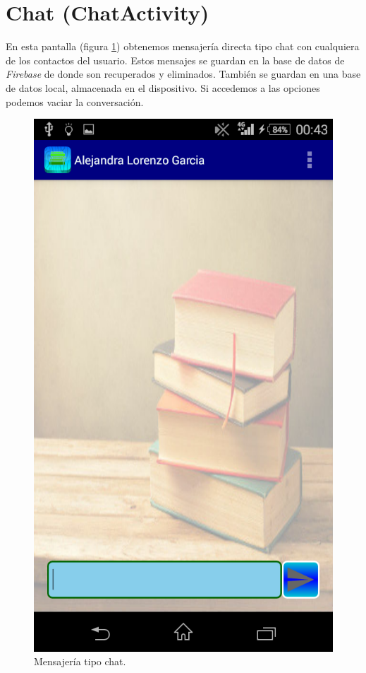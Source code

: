 	\section{Chat (ChatActivity)} \label{sec:chat}
	
		En esta pantalla (figura \ref{fig:chat}) obtenemos mensajería directa tipo chat con cualquiera de los contactos del usuario. Estos mensajes se guardan en la base de datos de {\it Firebase} de donde son recuperados y eliminados. También se guardan en una base de datos local, almacenada en el dispositivo. Si accedemos a las opciones podemos vaciar la conversación.
	
		\begin{figure}[h !]
			\centering
			\includegraphics[scale=0.2]{Imagenes/App/chat}
			\caption{Mensajería tipo chat.}
			\label{fig:chat}
		\end{figure}
	
